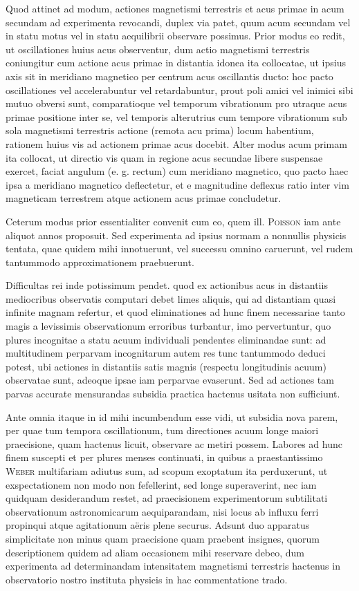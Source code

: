 Quod attinet ad modum, actiones magnetismi terrestris et acus primae in acum secundam ad experimenta revocandi, duplex via patet, quum acum secundam vel in statu motus vel in statu aequilibrii observare possimus. Prior modus eo redit, ut oscillationes huius acus observentur, dum actio magnetismi terrestris coniungitur cum actione acus primae in distantia idonea ita collocatae, ut ipsius axis sit in meridiano magnetico per centrum acus oscillantis ducto: hoc pacto oscillationes vel accelerabuntur vel retardabuntur, prout poli amici vel inimici sibi mutuo obversi sunt, comparatioque vel temporum vibrationum pro utraque acus primae positione inter se, vel temporis alterutrius cum tempore vibrationum sub sola magnetismi terrestris actione (remota acu prima) locum habentium, rationem huius vis ad actionem primae acus docebit. Alter modus acum primam ita collocat, ut directio vis quam in regione acus secundae libere suspensae exercet, faciat angulum (e. g. rectum) cum meridiano magnetico, quo pacto haec ipsa a meridiano magnetico deflectetur, et e magnitudine deflexus ratio inter vim magneticam terrestrem atque actionem acus primae concludetur.

Ceterum modus prior essentialiter convenit cum eo, quem ill. \textsc{Poisson} iam ante aliquot annos proposuit. Sed experimenta ad ipsius normam a nonnullis physicis tentata, quae quidem mihi innotuerunt, vel successu omnino caruerunt, vel rudem tantummodo approximationem praebuerunt.

Difficultas rei inde potissimum pendet. quod ex actionibus acus in distantiis mediocribus observatis computari debet limes aliquis, qui ad distantiam quasi infinite magnam refertur, et quod eliminationes ad hunc finem necessariae tanto magis a levissimis observationum erroribus turbantur, imo pervertuntur, quo plures incognitae a statu acuum individuali pendentes eliminandae sunt: ad multitudinem perparvam incognitarum autem res tunc tantummodo deduci potest, ubi actiones in distantiis satis magnis (respectu longitudinis acuum) observatae sunt, adeoque ipsae iam perparvae evaserunt. Sed ad actiones tam parvas accurate mensurandas subsidia practica hactenus usitata non sufficiunt.

Ante omnia itaque in id mihi incumbendum esse vidi, ut subsidia nova parem, per quae tum tempora oscillationum, tum directiones acuum longe maiori praecisione, quam hactenus licuit, observare ac metiri possem. Labores ad hunc finem suscepti et per plures menses continuati, in quibus a praestantissimo \textsc{Weber} multifariam adiutus sum, ad scopum exoptatum ita perduxerunt, ut exspectationem non modo non fefellerint, sed longe superaverint, nec iam quidquam desiderandum restet, ad praecisionem experimentorum subtilitati observationum astronomicarum aequiparandam, nisi locus ab influxu ferri propinqui atque agitationum aëris plene securus. Adsunt duo apparatus simplicitate non minus quam praecisione quam praebent insignes, quorum descriptionem quidem ad aliam occasionem mihi reservare debeo, dum experimenta ad determinandam intensitatem magnetismi terrestris hactenus in observatorio nostro instituta physicis in hac commentatione trado.
